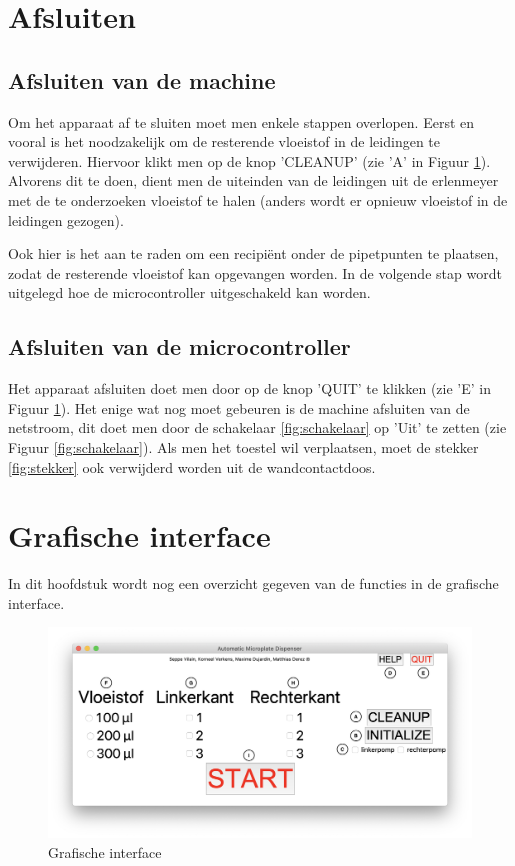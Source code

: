 \documentclass[a4paper,twoside,kulak]{kulakreport} %
\begin{document}
\chapter*{Afsluiten}

\section*{Afsluiten van de machine}
\label{sec:cleanup}

Om het apparaat af te sluiten moet men enkele stappen overlopen. Eerst en vooral is het noodzakelijk om de resterende vloeistof in de leidingen te verwijderen. Hiervoor klikt men op de knop 'CLEANUP' (zie 'A' in Figuur \ref{fig:GI_letters}). Alvorens dit te doen, dient men de uiteinden van de leidingen uit de erlenmeyer met de te onderzoeken vloeistof te halen (anders wordt er opnieuw vloeistof in de leidingen gezogen).


 Ook hier is het aan te raden om een recipiënt onder de pipetpunten te plaatsen, zodat de resterende vloeistof kan opgevangen worden. In de volgende stap wordt uitgelegd hoe de microcontroller uitgeschakeld kan worden.
 
 
\section*{Afsluiten van de microcontroller }
 
Het apparaat afsluiten doet men door op de knop 'QUIT' te klikken (zie 'E' in Figuur \ref{fig:GI_letters}). Het enige wat nog moet gebeuren is de machine afsluiten van de netstroom, dit doet men door de schakelaar \ref{fig:schakelaar} op 'Uit' te zetten (zie Figuur \ref{fig:schakelaar}). Als men het toestel wil verplaatsen, moet de stekker \ref{fig:stekker} ook verwijderd worden uit de wandcontactdoos. 

\chapter*{Grafische interface}

In dit hoofdstuk wordt nog een overzicht gegeven van de functies in de grafische interface. 

\begin{figure}[h]
	\centering
	\includegraphics[width=1.2\textwidth]{GI_letters}
	\caption{Grafische interface}
	\label{fig:GI_letters}
\end{figure}
\end{document}
